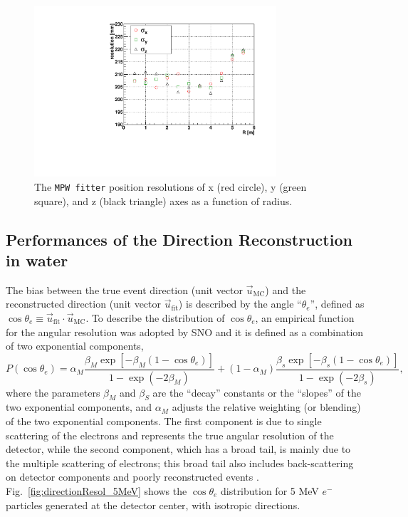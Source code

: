 \begin{figure}[htbp]
	\centering	
	\includegraphics[width=9cm]{shellTest_RvsResol.pdf}
	\caption[The \texttt{MPW fitter} position resolutions ($\sigma_{x,y,z}$) as a function of energies.]{The \texttt{MPW fitter} position resolutions of x (red circle), y (green square), and z (black triangle) axes as a function of radius.}
	\label{fig:FitResolVsShell}
\end{figure}
 
\subsection{Performances of the Direction Reconstruction in water}\label{sect:directResol}

The bias between the true event direction (unit vector $\vec{u}_{\mathrm{MC}}$) and the reconstructed direction (unit vector $\vec{u}_{\mathrm{fit}}$) is described by the angle ``$\theta_e$'', defined as $\cos\theta_e \equiv \vec{u}_{\mathrm{fit}} \cdot \vec{u}_{\mathrm{MC}}$. To describe the distribution of $\cos\theta_e$, an empirical function for the angular resolution was adopted by SNO\cite{boulay2004direct} and it is defined as a combination of two exponential components,
\begin{equation}\label{eq:directResol}
P(\cos\theta_e)=\alpha_M\frac{\beta_M\exp[-\beta_M(1-\cos\theta_e)]}{1-\exp(-2\beta_M)}+(1-\alpha_M)\frac{\beta_s\exp[-\beta_s(1-\cos\theta_e)]}{1-\exp(-2\beta_s)},
\end{equation}
where the parameters $\beta_M$ and $\beta_S$ are the ``decay'' constants or the ``slopes'' of the two exponential components, and $\alpha_M$ adjusts the relative weighting (or blending) of the two exponential components. The first component is due to single scattering of the electrons and represents the true angular resolution of the detector, while the second component, which has a broad tail, is mainly due to the multiple scattering of electrons; this broad tail also includes back-scattering on detector components and poorly reconstructed events \cite{boulay2004direct}. Fig.~\ref{fig:directionResol_5MeV} shows the $\cos\theta_e$ distribution for 5 MeV $e^-$ particles generated at the detector center, with isotropic directions.


